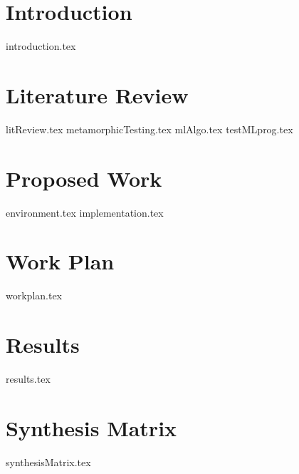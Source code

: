 \documentclass[print,ms]{unothesis}
\begin{document}
\chapter{Introduction}
{introduction.tex}
% 

\chapter{Literature Review}
{litReview.tex}
{metamorphicTesting.tex}
{mlAlgo.tex}
{testMLprog.tex}

\chapter{Proposed Work}
{environment.tex}
\newpage
{implementation.tex}

\chapter{Work Plan}
{workplan.tex}

\chapter{Results}
{results.tex}

\chapter{Synthesis Matrix}
{synthesisMatrix.tex}

\backmatter

\appendix



\nocite{*}


\end{document}
